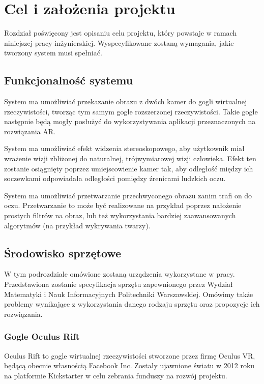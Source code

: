 \documentclass[a4paper,11pt,twoside]{report}
\theoremstyle{definition}
\begin{document}
\chapter{Cel i założenia projektu} %

Rozdział poświęcony jest opisaniu celu projektu, który powstaje w ramach niniejszej pracy inżynierskiej. Wyspecyfikowane zostaną wymagania, jakie tworzony system musi spełniać.

\section{Funkcjonalność systemu}
System ma umożliwiać przekazanie obrazu z dwóch kamer do gogli wirtualnej rzeczywistości, tworząc tym samym gogle rozszerzonej rzeczywistości. Takie gogle następnie będą mogły posłużyć do wykorzystywania aplikacji przeznaczonych na rozwiązania AR. 

System ma umożliwiać efekt widzenia stereoskopowego, aby użytkownik miał wrażenie wizji zbliżonej do naturalnej, trójwymiarowej wizji człowieka. Efekt ten zostanie osiągnięty poprzez umiejscowienie kamer tak, aby odległość między ich soczewkami odpowiadała odległości pomiędzy źrenicami ludzkich oczu. 

System ma umożliwiać przetwarzanie przechwyconego obrazu zanim trafi on do oczu. Przetwarzanie to może być realizowane na przykład poprzez nałożenie prostych filtrów na obraz, lub też wykorzystania bardziej zaawansowanych algorytmów (na przykład wykrywania twarzy).

\section{Środowisko sprzętowe}
W tym podrozdziale omówione zostaną urządzenia wykorzystane w pracy. Przedstawiona zostanie specyfikacja sprzętu zapewnionego przez Wydział Matematyki i Nauk Informacyjnych Politechniki Warszawskiej. Omówimy także problemy wynikające z wykorzystania danego rodzaju sprzętu oraz propozycje ich rozwiązania.

\subsection{Gogle Oculus Rift}
Oculus Rift to gogle wirtualnej rzeczywistości stworzone przez firmę Oculus VR, będącą obecnie własnością Facebook Inc. Zostały ujawnione światu w 2012 roku na platformie Kickstarter w celu zebrania funduszy na rozwój projektu. 
\end{document}
